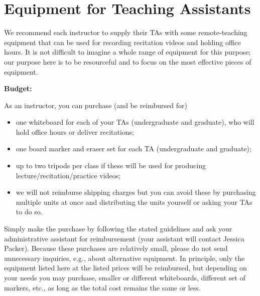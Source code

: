 \chapter{ Equipment for Teaching Assistants}


\begin{gram}
We recommend each instructor to supply their TAs with some
remote-teaching equipment that can be used for recording recitation
videos and holding office hours.
%
It is not difficult to imagine a whole range of equipment for this
purpose; our purpose here is to be resourceful and to focus on the most
effective pieces of equipment.
%

\textbf{Budget:}

As an instructor, you can purchase (and be reimbursed for)
\begin{itemize}
\item one whiteboard for each of your TAs (undergraduate and graduate), who will hold office hours or deliver recitations;


\item one board marker and eraser set for each TA (undergraduate and graduate);

\item
up to two tripods per class if these will be used for producing lecture/recitation/practice videos;

\item we will not reimburse shipping charges but you can avoid these by  purchasing multiple units at once and distributing the units yourself or asking your TAs to do so.

\end{itemize}

\end{gram}

\begin{important}[Reimbursement]
Simply make the purchase by following the stated guidelines and ask
your administrative assistant for reimbursement (your assistant will
contact Jessica Packer).
%
Because these purchases are relatively small, please do not send unnecessary inquiries, e.g., about alternative equipment.
%
In principle, only the equipment listed here at the listed prices will
be reimbursed, but depending on your needs you may purchase, smaller
or different whiteboards, different set of markers, etc.,  as long as the
total cost remains the same or less.
\end{important}


